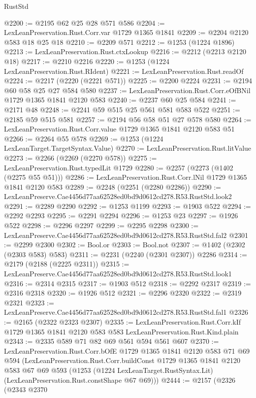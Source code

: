 \begin{lexlean}{RustStd}
\begin{coremodule}
@2200 := @2195 @62 @25 @28 @571 @586
@2204 := LexLeanPreservation.Rust.Corr.var @1729 @1365 @1841
@2209 := @2204 @2120 @583 @18 @25 @18
@2210 := @2209 @571
@2212 := @1253 (@1224 @1896)
@2213 := LexLeanPreservation.Rust.ctxLookup
@2216 := @2212 (@2213 @2120 @18)
@2217 := @2210 @2216
@2220 := @1253 (@1224 LexLeanPreservation.Rust.RIdent)
@2221 := LexLeanPreservation.Rust.readOf
@2224 := @2217 (@2220 (@2221 @571))
@2225 := @2200 @2224
@2231 := @2194 @60 @58 @25 @27 @584 @580
@2237 := LexLeanPreservation.Rust.Corr.eOfBNil @1729 @1365 @1841 @2120 @583
@2240 := @2237 @60 @25 @584
@2241 := @2171 @48
@2248 := @2241 @59 @515 @25 @561 @581 @583 @522
@2251 := @2185 @59 @515 @581
@2257 := @2194 @56 @58 @51 @27 @578 @580
@2264 := LexLeanPreservation.Rust.Corr.value @1729 @1365 @1841 @2120 @583 @51
@2266 := @2264 @55 @578
@2269 := @1253 (@1224 LexLeanTarget.TargetSyntax.Value)
@2270 := LexLeanPreservation.Rust.litValue
@2273 := @2266 (@2269 (@2270 @578))
@2275 := LexLeanPreservation.Rust.typedLit @1729
@2280 := @2257 (@2273 (@1402 (@2275 @55 @51)))
@2286 := LexLeanPreservation.Rust.Corr.lNil @1729 @1365 @1841 @2120 @583
@2289 := @2248 (@2251 (@2280 @2286))
@2290 := LexLeanPreserve.Cae4456d77aa62528ed0bd9d0612cd278.R53.RustStd.look2
@2291 := @2289 @2290
@2292 := @1253 @1199
@2293 := @1903 @522
@2294 := @2292 @2293
@2295 := @2291 @2294
@2296 := @1253 @23
@2297 := @1926 @522
@2298 := @2296 @2297
@2299 := @2295 @2298
@2300 := LexLeanPreserve.Cae4456d77aa62528ed0bd9d0612cd278.R53.RustStd.fal2
@2301 := @2299 @2300
@2302 := Bool.or
@2303 := Bool.not
@2307 := @1402 (@2302 (@2303 @583) @583)
@2311 := @2231 (@2240 (@2301 @2307)) @2286
@2314 := @2179 (@2188 (@2225 @2311))
@2315 := LexLeanPreserve.Cae4456d77aa62528ed0bd9d0612cd278.R53.RustStd.look1
@2316 := @2314 @2315
@2317 := @1903 @512
@2318 := @2292 @2317
@2319 := @2316 @2318
@2320 := @1926 @512
@2321 := @2296 @2320
@2322 := @2319 @2321
@2323 := LexLeanPreserve.Cae4456d77aa62528ed0bd9d0612cd278.R53.RustStd.fal1
@2326 := @2165 (@2322 @2323 @2307)
@2335 := LexLeanPreservation.Rust.Corr.kIf
    @1729
    @1365
    @1841
    @2120
    @583
    @583
    LexLeanPreservation.Rust.Kind.plain
@2343 := @2335 @589 @71 @82 @69 @561 @594 @561 @607
@2370 := LexLeanPreservation.Rust.Corr.bOfE
    @1729
    @1365
    @1841
    @2120
    @583
    @71
    @69
    @594
    (LexLeanPreservation.Rust.Corr.buildConst
      @1729
      @1365
      @1841
      @2120
      @583
      @67
      @69
      @593
      (@1253 (@1224 LexLeanTarget.RustSyntax.Lit) (LexLeanPreservation.Rust.constShape @67 @69)))
@2444 := @2157
    (@2326
      (@2343
        @2370

\end{coremodule}
\end{lexlean}
